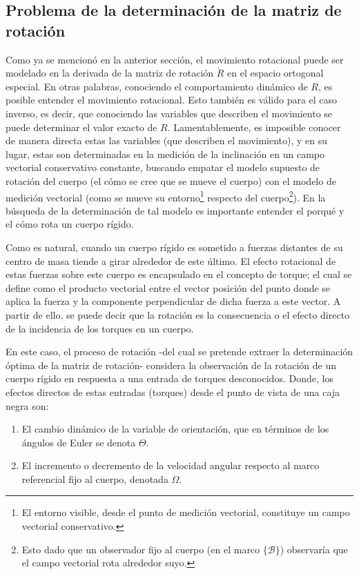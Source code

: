 \documentclass[10pt]{report}
\numberwithin{equation}{chapter}
\numberwithin{algorithm}{chapter}
\newcommand{\marco}[1]{\{\mathcal{#1}\}}
\begin{document}
\subsection{Problema de la determinación de la matriz de rotación}
Como ya se mencionó en la anterior sección, el movimiento rotacional puede ser modelado en la derivada de la matriz de rotación $\dot{R}$ en el espacio ortogonal especial. En otras palabras, conociendo el comportamiento dinámico de $R$, es posible entender el movimiento rotacional. Esto también es válido para el caso inverso, es decir, que conociendo las variables que describen el movimiento se puede determinar el valor exacto de $R$. Lamentablemente, es imposible conocer de manera directa estas las variables (que describen el movimiento), y en su lugar, estas son determinadas en la medición de la inclinación en un campo vectorial conservativo constante, buscando empatar el modelo supuesto de rotación del cuerpo (el cómo se cree que se mueve el cuerpo) con el modelo de medición vectorial (como se mueve su entorno\footnote{El entorno visible, desde el punto de medición vectorial, constituye un campo vectorial conservativo.} respecto del cuerpo\footnote{Esto dado que un observador fijo al cuerpo (en el marco $\marco{B}$) observaría que el campo vectorial rota alrededor suyo.}). En la búsqueda de la determinación de tal modelo es importante entender el porqué y el cómo rota un cuerpo rígido.
\par
Como es natural, cuando un cuerpo rígido es sometido a fuerzas distantes de su centro de masa tiende a girar alrededor de este último. El efecto rotacional de estas fuerzas sobre este cuerpo es encapsulado en el concepto de torque; el cual se define como el producto vectorial entre el vector posición del punto donde se aplica la fuerza y la componente perpendicular de dicha fuerza a este vector. A partir de ello, se puede decir que la rotación es la consecuencia o el efecto directo de la incidencia de los torques en un cuerpo.\par
En este caso, el proceso de rotación -del cual se pretende extraer la determinación óptima de la matriz de rotación- considera la observación de la rotación de un cuerpo rígido en respuesta a una entrada de torques desconocidos. Donde, los efectos directos de estas entradas (torques) desde el punto de vista de una caja negra son:
\begin{enumerate}
\item El cambio dinámico de la variable de orientación, que en términos de los ángulos de Euler se denota $\Theta$.
\item El incremento o decremento de la velocidad angular respecto al marco referencial fijo al cuerpo, denotada $\Omega$. \end{enumerate}
\end{document}
